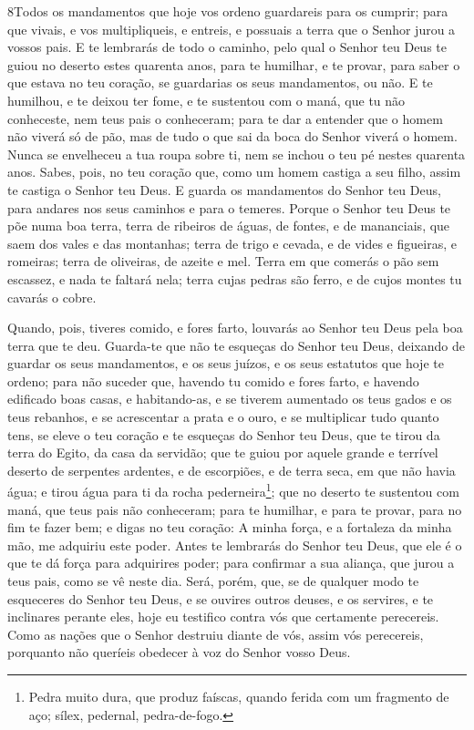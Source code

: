 \lettrine{8} Todos os mandamentos que hoje vos ordeno
guardareis para os cumprir; para que vivais, e vos multipliqueis, e
entreis, e possuais a terra que o Senhor jurou a vossos pais. E
te lembrarás de todo o caminho, pelo qual o Senhor teu Deus te guiou
no deserto estes quarenta anos, para te humilhar, e te provar, para
saber o que estava no teu coração, se guardarias os seus
mandamentos, ou não. E te humilhou, e te deixou ter fome, e te
sustentou com o maná, que tu não conheceste, nem teus pais o
conheceram; para te dar a entender que o homem não viverá só de pão,
mas de tudo o que sai da boca do Senhor viverá o homem. Nunca se
envelheceu a tua roupa sobre ti, nem se inchou o teu pé nestes
quarenta anos. Sabes, pois, no teu coração que, como um homem
castiga a seu filho, assim te castiga o Senhor teu Deus. E
guarda os mandamentos do Senhor teu Deus, para andares nos seus
caminhos e para o temeres. Porque o Senhor teu Deus te põe numa
boa terra, terra de ribeiros de águas, de fontes, e de mananciais,
que saem dos vales e das montanhas; terra de trigo e cevada, e
de vides e figueiras, e romeiras; terra de oliveiras, de azeite e
mel. Terra em que comerás o pão sem escassez, e nada te faltará
nela; terra cujas pedras são ferro, e de cujos montes tu cavarás o
cobre.

Quando, pois, tiveres comido, e fores farto, louvarás ao Senhor
teu Deus pela boa terra que te deu. Guarda-te que não te
esqueças do Senhor teu Deus, deixando de guardar os seus
mandamentos, e os seus juízos, e os seus estatutos que hoje te
ordeno; para não suceder que, havendo tu comido e fores
farto, e havendo edificado boas casas, e habitando-as, e se
tiverem aumentado os teus gados e os teus rebanhos, e se acrescentar
a prata e o ouro, e se multiplicar tudo quanto tens, se eleve
o teu coração e te esqueças do Senhor teu Deus, que te tirou da
terra do Egito, da casa da servidão; que te guiou por aquele
grande e terrível deserto de serpentes ardentes, e de escorpiões, e
de terra seca, em que não havia água; e tirou água para ti da rocha
pederneira\footnote{Pedra muito dura, que produz faíscas, quando
ferida com um fragmento de aço; sílex, pedernal, pedra-de-fogo.};
que no deserto te sustentou com maná, que teus pais não
conheceram; para te humilhar, e para te provar, para no fim te fazer
bem; e digas no teu coração: A minha força, e a fortaleza da
minha mão, me adquiriu este poder. Antes te lembrarás do
Senhor teu Deus, que ele é o que te dá força para adquirires poder;
para confirmar a sua aliança, que jurou a teus pais, como se vê
neste dia. Será, porém, que, se de qualquer modo te
esqueceres do Senhor teu Deus, e se ouvires outros deuses, e os
servires, e te inclinares perante eles, hoje eu testifico contra vós
que certamente perecereis. Como as nações que o Senhor
destruiu diante de vós, assim vós perecereis, porquanto não queríeis
obedecer à voz do Senhor vosso Deus.

